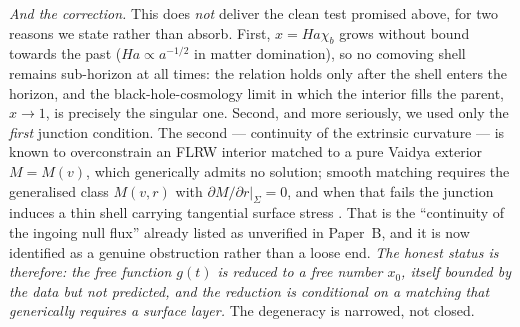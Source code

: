 \documentclass[11pt]{article}
\begin{document}
\emph{And the correction.} This does \emph{not} deliver the clean test promised above, for two
reasons we state rather than absorb. First, $x = Ha\chi_b$ grows without bound towards the past
($Ha \propto a^{-1/2}$ in matter domination), so no comoving shell remains sub-horizon at all
times: the relation holds only after the shell enters the horizon, and the black-hole-cosmology
limit in which the interior fills the parent, $x \to 1$, is precisely the singular one. Second,
and more seriously, we used only the \emph{first} junction condition. The second --- continuity of
the extrinsic curvature --- is known to overconstrain an FLRW interior matched to a pure Vaidya
exterior $M = M(v)$, which generically admits no solution; smooth matching requires the
generalised class $M(v,r)$ with $\partial M/\partial r|_\Sigma = 0$, and when that fails the
junction induces a thin shell carrying tangential surface stress \cite{OSfR2026,GenVaidya2026}.
That is the ``continuity of the ingoing null flux'' already listed as unverified in Paper~B, and
it is now identified as a genuine obstruction rather than a loose end. \emph{The honest status is
therefore: the free function $g(t)$ is reduced to a free number $x_0$, itself bounded by the data
but not predicted, and the reduction is conditional on a matching that generically requires a
surface layer.} The degeneracy is narrowed, not closed.
\end{document}
